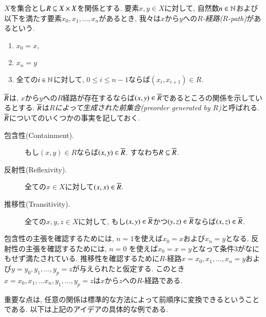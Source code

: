 \begin{example}
$X$を集合とし$R\ss X\times X$を関係とする. 要素$x,y\in X$に対して, 自然数$n\in\NN$および以下を満たす要素$x_0,x_1,\ldots,x_n$があるとき, 我々は$x$から$y$への\emph{$R$-経路($R$-path)}があるという.
\begin{enumerate}
\item $x_0=x$,
\item $x_n=y$
\item 全ての$i\in\NN$に対して, $0\leq i\leq n-1$ならば$(x_i,x_{i+1})\in R$.
\end{enumerate}
$\ol{R}$は, $x$から$y$への$R$経路が存在するならば$(x,y)\in\ol{R}$であるところの関係を示しているとする. $\ol{R}$は\emph{$R$によって生成された前集合(preorder generated by $R$)}と呼ばれる. $\ol{R}$についてのいくつかの事実を記しておく. 
\begin{description}
\item[包含性(Containment).] もし$(x,y)\in R$ならば$(x,y)\in\ol{R}$. すなわち$R\ss\ol{R}$.
\item[反射性(Reflexivity).] 全ての$x\in X$に対して$(x,x)\in\ol{R}$. 
\item[推移性(Transitivity).] 全ての$x,y,z\in X$に対して, もし$(x,y)\in\ol{R}$かつ$(y,z)\in\ol{R}$ならば$(x,z)\in\ol{R}$.
\end{description}
包含性の主張を確認するためには, $n=1$を使えば$x_0=x$および$x_n=y$となる. 反射性の主張を確認するためには, $n=0$ を使えば$x_0=x=y$となって条件3がなにもせず満たされている. 推移性を確認するために$R$-経路$x=x_0,x_1,\ldots,x_n=y$および$y=y_0,y_1,\ldots,y_p=z$が与えられたと仮定する. このとき$x=x_0,x_1,\ldots x_n,y_1,\ldots,y_p=z$は$x$から$z$への$R$-経路である.


重要な点は, 任意の関係は標準的な方法によって前順序に変換できるということである. 以下は上記のアイデアの具体的な例である.



\end{example}
